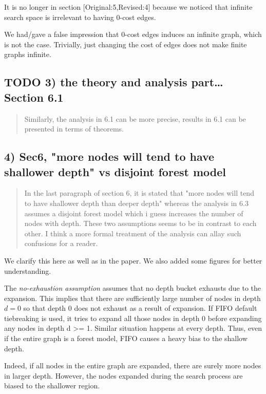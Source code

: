 \documentclass{article}
\begin{document}
It is no longer in section [Original:5,Revised:4] because we noticed that
infinite search space is irrelevant to having 0-cost edges.

We had/gave a false impression that 0-cost edges induces an infinite graph, which is not the case.
Trivially, just changing the cost of edges does not make finite graphs infinite.

\subsection{{\bfseries\sffamily TODO} 3) the theory and analysis part\ldots{} Section 6.1}
\label{sec:orgheadline17}

\begin{quote}
Similarly, the analysis in 6.1 can be more
precise, results in 6.1 can be presented in terms of theorems.
\end{quote}

\subsection{4) Sec6, "more nodes will tend to have shallower depth" vs disjoint forest model}
\label{sec:orgheadline18}

\begin{quote}
 In the last paragraph of section 6, it is stated that "more nodes
will tend to have shallower depth than deeper depth" whereas the
analysis in 6.3 assumes a disjoint forest model which i guess
increases the number of nodes with depth. These two assumptions seems
to be in contrast to each other. I think a more formal treatment of
the analysis can allay such confusions for a reader.
\end{quote}

We clarify this here as well as in the paper.
We also added some figures for better understanding.

The \emph{no-exhaustion assumption} assumes that no depth bucket exhausts due to the expansion.
This implies that there are sufficiently large number of nodes in depth \(d=0\) so that
 depth 0 does not exhaust as a result of expansion.
If FIFO default tiebreaking is used,
it tries to expand all those nodes in depth 0 before expanding any nodes in depth d >= 1.
Similar situation happens at every depth.
Thus, even if the entire graph is a forest model, FIFO causes a heavy bias to the shallow depth.

Indeed, if all nodes in the entire graph are expanded, there are surely more nodes in larger depth.
However, the nodes expanded during the search process are biased to the shallower region.
\end{document}
